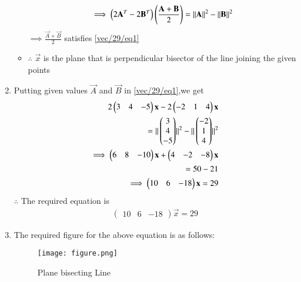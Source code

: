 \documentclass[journal,12pt,twocolumn]{IEEEtran}
\newcommand{\myvec}[1]{\ensuremath{\begin{pmatrix}#1\end{pmatrix}}}
\begin{document}
\begin{enumerate}
\begin{itemize}
\begin{align}
\implies\myvec{2\vec{A}^T-2\vec{B}^T}\brak{\frac{\vec{A}+\vec{B}}{2}}=\norm{\vec{A}}^2-\norm{\vec{B}}^2 
\end{align}
$\implies \frac{\vec{A}+\vec{B}}{2}$ satisfies \eqref{vec/29/eq1}
\item $\therefore$ $\vec{x}$ is the plane that is perpendicular bisector of the line joining the given points 
\end{itemize}
\item Putting given values $\vec{A}$ and $\vec{B}$ in \eqref{vec/29/eq1},we get 
\begin{align}
2\myvec{3 & 4 & -5}\vec{x}-2\myvec{-2 & 1 & 4}\vec{x}
\\
=\norm{\myvec{3\\4\\-5}}^2-\norm{\myvec{-2\\1\\4}}^2
\\
\implies\myvec{6 & 8 & -10}\vec{x}+\myvec{4 & -2 & -8}\vec{x} 
\\
=50-21
\\
\implies\myvec{10 & 6 & -18}\vec{x}=29
\end{align}
$\therefore$ The required equation is
\begin{align}
\myvec{10 & 6 & -18}\vec{x}=29
\end{align}

\item The required figure for the above equation is as follows:
\begin{figure}[!ht]
    \centering
    \texttt{[image: figure.png]}
    \caption{Plane bisecting Line}
    \label{quadform/73/b/fig:Plane bisecting Line}
\end{figure} 
\end{enumerate}
\end{document}
